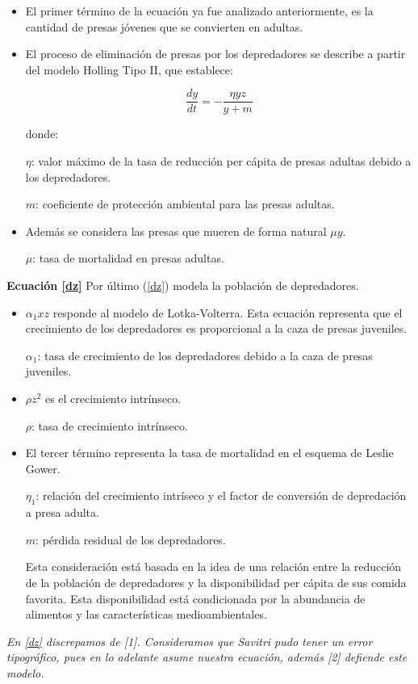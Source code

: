 \documentclass{wscpaperproc}
\theoremstyle{wsc}
\begin{document}
\begin{itemize}
	\item El primer término de la ecuación ya fue analizado anteriormente, es la cantidad de presas jóvenes que se convierten en adultas.

	\item El proceso de eliminación de presas por los depredadores se describe a partir del modelo Holling Tipo II, que establece:

	      $$\frac{dy}{dt} = -\frac{\eta yz}{y+m}$$

	      donde:

	      $\eta$: valor máximo de la tasa de reducción per cápita de presas adultas debido a los depredadores.

	      $m$: coeficiente de protección ambiental para las presas adultas.

	\item Además se considera las presas que mueren de forma natural $\mu y$.

	      $\mu$: tasa de mortalidad en presas adultas.
\end{itemize}

\vspace*{1cm}
{\bf Ecuación \ref*{dz}}
Por último (\ref*{dz}) modela la población de depredadores.

\begin{itemize}
	\item $\alpha_1 xz$ responde al modelo de Lotka-Volterra. Esta ecuación representa que el crecimiento de los depredadores es
	      proporcional a la caza de presas juveniles.

	      $\alpha_1$: tasa de crecimiento de los depredadores debido a la caza de presas juveniles.

	      \vspace*{0.3cm}

	\item $\rho z^2$ es el crecimiento intrínseco.

	      $\rho$: tasa de crecimiento intrínseco.

	\item El tercer término representa la tasa de mortalidad en el esquema de Leslie Gower.

	      $\eta_1$: relación del crecimiento intríseco y el factor de conversión de depredación a presa adulta.

	      $m$: pérdida residual de los depredadores.

	      Esta consideración está basada en la idea de una relación entre la reducción de la población de depredadores y la
	      disponibilidad per cápita de sus comida favorita. Esta disponibilidad está condicionada por la abundancia de alimentos
		  y las características medioambientales.
\end{itemize}
\vspace*{3cm}
{\it En \ref*{dz} discrepamos de [1]. Consideramos que Savitri pudo tener un error tipográfico, pues en lo adelante asume nuestra
ecuación, además [2] defiende este modelo.}
\end{document}

